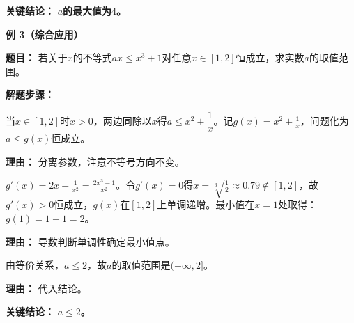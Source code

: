 \begin{examplebox}
	\textbf{\textcolor{CExample}{关键结论：}}
	\textbf{$a$的最大值为$4$。}

	\medskip
	\textbf{\textcolor{CExample}{例 3（综合应用）}}

	\textbf{\textcolor{CExample}{题目：}}
	若关于$x$的不等式$ax\le x^3+1$对任意$x\in[1,2]$恒成立，求实数$a$的取值范围。

	\textbf{\textcolor{CExample}{解题步骤：}}
	\begin{description}[style=nextline, leftmargin=2.8em, labelsep=0.5em, itemsep=0.45em]
		\item[\textbf{第一步（分离参数）：}] 当$x\in[1,2]$时$x>0$，两边同除以$x$得$a\le x^2+\dfrac{1}{x}$。记$g(x)=x^2+\frac{1}{x}$，问题化为$a\le g(x)$恒成立。
			\par\textbf{理由：} 分离参数，注意不等号方向不变。
		\item[\textbf{第二步（求最小值）：}] $g'(x)=2x-\frac{1}{x^2}=\frac{2x^3-1}{x^2}$。令$g'(x)=0$得$x=\sqrt[3]{\frac12}\approx0.79\notin[1,2]$，故$g'(x)>0$恒成立，$g(x)$在$[1,2]$上单调递增。最小值在$x=1$处取得：$g(1)=1+1=2$。
			\par\textbf{理由：} 导数判断单调性确定最小值点。
		\item[\textbf{第三步（得范围）：}] 由等价关系，$a\le2$，故$a$的取值范围是$(-\infty,2]$。
			\par\textbf{理由：} 代入结论。
	\end{description}

	\textbf{\textcolor{CExample}{关键结论：}}
	\textbf{$a\le2$。}
\end{examplebox}
